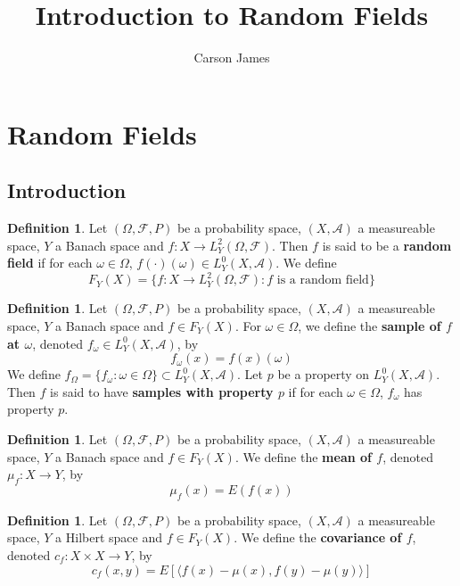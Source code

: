 \documentclass[12pt]{amsart}
\theoremstyle{definition}
\newtheorem{defn}[definition]{Definition}
\newcommand{\om}{\omega}
\newcommand{\Om}{\Omega}
\newcommand{\MA}{\mathcal{A}}
\newcommand{\MF}{\mathcal{F}}
\renewcommand{\r}{\rangle}
\renewcommand{\l}{\langle}
\begin{document}
	
	\title{Introduction to Random Fields}
	\author{Carson James}
	\maketitle
	
	\tableofcontents
	
	\section{Random Fields}

	\subsection{Introduction}
	
	\begin{defn}
	Let $(\Om, \MF, P)$ be a probability space, $(X, \MA)$ a measureable space, $Y$ a Banach space and $f: X \rightarrow L^2_Y(\Om, \MF)$. Then $f$ is said to be a \textbf{random field} if for each $\om \in \Om$, $ f(\cdot)(\om) \in L_Y^0(X, \MA)$.
	We define $$F_Y(X) = \{f:X \rightarrow L^2_Y(\Om, \MF): \text{$f$ is a random field}\}$$  
	\end{defn}
	
	\begin{defn}
	Let $(\Om, \MF, P)$ be a probability space, $(X, \MA)$ a measureable space, $Y$ a Banach space and $f \in F_Y(X)$. For $\om \in \Om$, we define the \textbf{ sample of $f$ at $\om$}, denoted $f_{\om} \in L^0_Y(X, \MA)$, by $$f_{\om}(x) = f(x)(\om)$$
	We define $f_{\Om} = \{f_{\om}: \om \in \Om \}\subset L^0_Y(X, \MA)$. Let $p$ be a property on $L^0_Y(X, \MA)$. Then $f$ is said to have \textbf{samples with property $p$} if for each $\om \in \Om$, $f_{\om}$ has property $p$.
	\end{defn}
	
	\begin{defn}
	Let $(\Om, \MF, P)$ be a probability space, $(X, \MA)$ a measureable space, $Y$ a Banach space and $f \in F_Y(X)$. We define the \textbf{mean of $f$}, denoted $\mu_f:X \rightarrow Y$, by $$\mu_f(x) = E(f(x))$$
	\end{defn}	
	
	\begin{defn}
	Let $(\Om, \MF, P)$ be a probability space, $(X, \MA)$ a measureable space, $Y$ a Hilbert space and $f \in F_Y(X)$. We define the \textbf{covariance of $f$}, denoted $c_f:X \times X \rightarrow Y$, by $$c_f(x, y) = E[\l f(x) - \mu(x), f(y) - \mu(y) \r]$$ 
	\end{defn}
	
\end{document}
